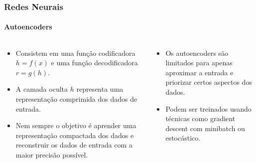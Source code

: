 \documentclass[aspectratio=169]{beamer}
\begin{document}
	\begin{frame}
		\frametitle{Redes Neurais}
		\framesubtitle{Autoencoders}
		\begin{columns}[t]
			\begin{column}{0.5\textwidth}
				\begin{itemize}
					\item Consistem em uma função codificadora $h = f(x)$ e uma função decodificadora $r = g(h)$.
					\item A camada oculta $h$ representa uma representação comprimida dos dados de entrada.
					\item Nem sempre o objetivo é aprender uma representação compactada dos dados e reconstruir os dados de entrada com a maior precisão possível.
				\end{itemize}
			\end{column}
			\begin{column}{0.5\textwidth}
				\begin{itemize}
					\item Os autoencoders são limitados para apenas aproximar a entrada e priorizar certos aspectos dos dados.
					\item Podem ser treinados usando técnicas como gradient descent com minibatch ou estocástico.
				\end{itemize}
				\begin{figure}[h]
					\centering
       				\resizebox{\textwidth}{!}{}
					\label{fig:autoencoder}
				\end{figure}
			\end{column}
		\end{columns}
	\end{frame}
	
\end{document}
